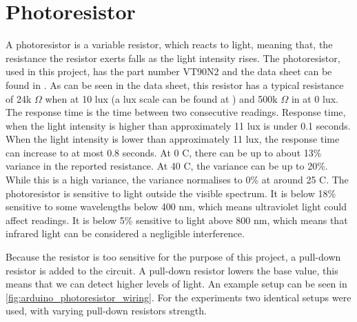 \section{Photoresistor}\label{sub:photoresistor}
A photoresistor is a variable resistor, which reacts to light, meaning that, the resistance the resistor exerts falls as the light intensity rises. The photoresistor, used in this project, has the part number VT90N2 and the data sheet can be found in \cite{photoresistor_sheet}. As can be seen in the data sheet, this resistor has a typical resistance of 24k $\Omega$ when at 10 lux (a lux scale can be found at \cite{lux_scale}) and 500k $\Omega$ in at 0 lux. The response time is the time between two consecutive readings. Response time, when the light intensity is higher than approximately 11 lux is under 0.1 seconds. When the light intensity is lower than approximately 11 lux, the response time can increase to at most 0.8 seconds. At 0 \degree C, there can be up to about 13\% variance in the reported resistance. At 40 \degree C, the variance can be up to 20\%. While this is a high variance, the variance normalises to 0\% at around 25 \degree C. The photoresistor is sensitive to light outside the visible spectrum. It is below 18\% sensitive to some wavelengths below 400 nm, which means ultraviolet light could affect readings. It is below 5\% sensitive to light above 800 nm, which means that infrared light can be considered a negligible interference.

Because the resistor is too sensitive for the purpose of this project, a pull-down resistor is added to the circuit\cite{pulldown_resistor}. A pull-down resistor lowers the base value, this means that we can detect higher levels of light. An example setup can be seen in \cref{fig:arduino_photoresistor_wiring}. For the experiments two identical setups were used, with varying pull-down resistors strength.

